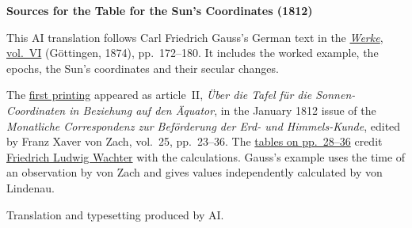 \clearpage\thispagestyle{empty}
\begin{center}\textbf{Sources for the Table for the Sun’s Coordinates (1812)}\end{center}
\noindent This AI translation follows Carl Friedrich Gauss’s German text in the \href{https://gdz.sub.uni-goettingen.de/id/PPN236007467}{\textit{Werke}, vol.~VI} (Göttingen, 1874), pp.~172--180. It includes the worked example, the epochs, the Sun’s coordinates and their secular changes.
\par\smallskip\noindent The \href{https://www.digitale-sammlungen.de/en/view/bsb10538614?page=29}{first printing} appeared as article~II, \textit{Über die Tafel für die Sonnen-Coordinaten in Beziehung auf den Äquator}, in the January 1812 issue of the \textit{Monatliche Correspondenz zur Beförderung der Erd- und Himmels-Kunde}, edited by Franz Xaver von Zach, vol.~25, pp.~23--36. The \href{https://www.digitale-sammlungen.de/en/view/bsb10538614?page=34}{tables on pp.~28--36} credit \href{https://www.deutsche-biographie.de/gnd134127897.html#ndbcontent}{Friedrich Ludwig Wachter} with the calculations. Gauss’s example uses the time of an observation by von Zach and gives values independently calculated by von Lindenau.
\par\smallskip\noindent Translation and typesetting produced by AI.
\clearpage
